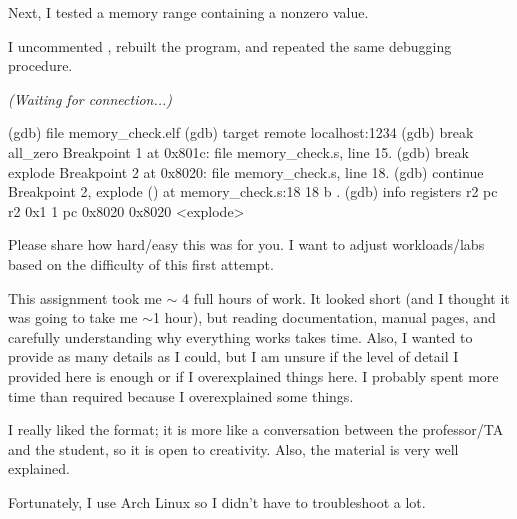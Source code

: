Next, I tested a memory range containing a nonzero value.

I uncommented , rebuilt the program, and repeated the same debugging procedure.

\begin{terminal}
\textit{(Waiting for connection...)}
\end{terminal}

\begin{terminal}
(gdb) file memory_check.elf
(gdb) target remote localhost:1234
(gdb) break all_zero
Breakpoint 1 at 0x801c: file memory_check.s, line 15.
(gdb) break explode
Breakpoint 2 at 0x8020: file memory_check.s, line 18.
(gdb) continue
Breakpoint 2, explode () at memory_check.s:18
18          b .
(gdb) info registers r2 pc
r2             0x1                 1
pc             0x8020              0x8020 <explode>
\end{terminal}

\begin{callout}
Please share how hard/easy this was for you. I want to adjust workloads/labs based on the difficulty of this first attempt.
\end{callout}

This assignment took me \(\sim\) 4 full hours of work.
It looked short (and I thought it was going to take me \(\sim\)1 hour), but reading documentation, manual pages, and carefully understanding why everything works takes time.
Also, I wanted to provide as many details as I could, but I am unsure if the level of detail I provided here is enough or if I overexplained things here.
I probably spent more time than required because I overexplained some things.

I really liked the format; it is more like a conversation between the professor/TA and the student, so it is open to creativity. Also, the material is very well explained.

Fortunately, I use Arch Linux so I didn't have to troubleshoot a lot.


